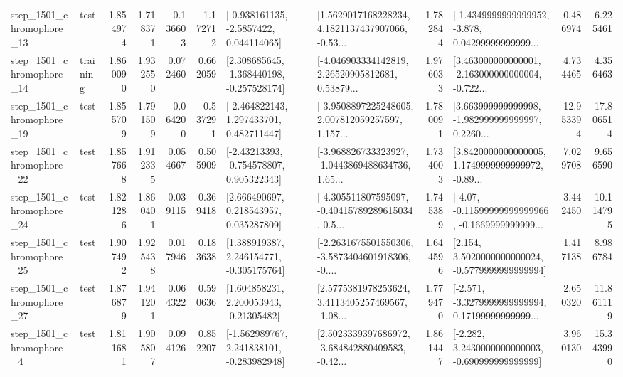 \begin{tabular}{llrrrrllrlrr}
 step\_1501\_chromophore\_13 &      test &      1.854974 &    1.718371 &     -0.136603 & -1.172712 &     [-0.938161135, -2.5857422, 0.044114065] &  [1.5629017168228234, 4.1821137437907066, -0.53... &       1.782844 &  [-1.4349999999999952, -3.878, 0.04299999999999... &            0.486974 &          6.225461 \\
 step\_1501\_chromophore\_14 &  training &      1.860090 &    1.932550 &      0.072460 &  0.662059 &   [2.308685645, -1.368440198, -0.257528174] &  [-4.046903334142819, 2.26520905812681, 0.53879... &       1.976033 &  [3.463000000000001, -2.163000000000004, -0.722... &            4.734465 &          4.356463 \\
 step\_1501\_chromophore\_19 &      test &      1.855709 &    1.791509 &     -0.064200 & -0.537291 &    [-2.464822143, 1.297433701, 0.482711447] &  [-3.9508897225248605, 2.007812059257597, 1.157... &       1.780091 &  [3.663999999999998, -1.982999999999997, 0.2260... &           12.953394 &         17.806514 \\
 step\_1501\_chromophore\_22 &      test &      1.857668 &    1.912335 &      0.054667 &  0.505909 &    [-2.43213393, -0.754578807, 0.905322343] &  [-3.968826733323927, -1.0443869488634736, 1.65... &       1.734003 &  [3.8420000000000005, 1.1749999999999972, -0.89... &            7.029708 &          9.656590 \\
 step\_1501\_chromophore\_24 &      test &      1.821286 &    1.860401 &      0.039115 &  0.369418 &     [2.666490697, 0.218543957, 0.035287809] &  [-4.305511807595097, -0.40415789289615034, 0.5... &       1.745389 &  [-4.07, -0.11599999999999966, -0.1669999999999... &            3.442450 &         10.114795 \\
 step\_1501\_chromophore\_25 &      test &      1.907492 &    1.925438 &      0.017946 &  0.183638 &    [1.388919387, 2.246154771, -0.305175764] &  [-2.2631675501550306, -3.5873404601918306, -0.... &       1.644596 &   [2.154, 3.5020000000000024, -0.5779999999999994] &            1.417138 &          8.986784 \\
 step\_1501\_chromophore\_27 &      test &      1.876879 &    1.941201 &      0.064322 &  0.590636 &     [1.604858231, 2.200053943, -0.21305482] &  [2.5775381978253624, 3.4113405257469567, -1.08... &       1.779470 &  [-2.571, -3.3279999999999994, 0.17199999999999... &            2.650320 &         11.861119 \\
  step\_1501\_chromophore\_4 &      test &      1.811681 &    1.905807 &      0.094126 &  0.852207 &   [-1.562989767, 2.241838101, -0.283982948] &  [2.5023339397686972, -3.684842880409583, -0.42... &       1.861447 &   [-2.282, 3.2430000000000003, -0.690999999999999] &            3.960130 &         15.343990 \\

\end{tabular}
